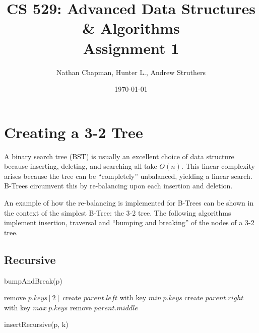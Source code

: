 \documentclass{article}
\title{CS 529: Advanced Data Structures \& Algorithms \\ Assignment 1}
\author{Nathan Chapman, Hunter L., Andrew Struthers}
\date{\today}
\begin{document}
\maketitle

\section*{Creating a 3-2 Tree}

    A binary search tree (BST) is usually an excellent choice of data structure because inserting, deleting, and searching all take $O(n)$.  This linear complexity arises because the tree can be ``completely'' unbalanced, yielding a linear search.  B-Trees circumvent this by re-balancing upon each insertion and deletion.

    An example of how the re-balancing is implemented for B-Trees can be shown in the context of the simplest B-Tree: the 3-2 tree.  The following algorithms implement insertion, traversal and ``bumping and breaking'' of the nodes of a 3-2 tree.

    \subsection*{Recursive}

        \begin{function}
            \caption{bumpAndBreak(p)}
            \DontPrintSemicolon


            remove $p.keys[2]$\;
            create $parent.left$ with key $min \ p.keys$\;
            create $parent.right$ with key $max \ p.keys$\;
            remove $parent.middle$\;
        \end{function}

        \begin{function}
            \caption{insertRecursive(p, k)}
            \DontPrintSemicolon


        \end{function}
\end{document}
